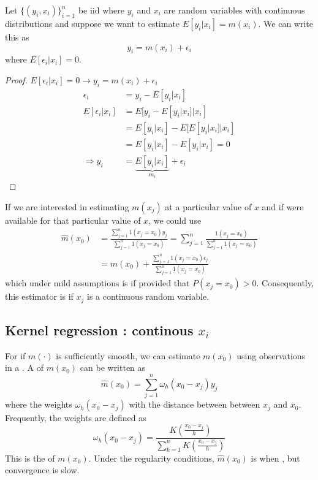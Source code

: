 Let $\{(y_i,x_i)\}_{i=1}^{n}$ be iid where $y_i$ and $x_i$ are random variables with continuous distributions and suppose we want to estimate $E[y_i|x_i] = m(x_i)$.
We can write this as 
\begin{equation*}
    y_i = m(x_i) + \epsilon_i
\end{equation*}
where $E[\epsilon_i|x_i] = 0$.
\begin{proof}
    $E[\epsilon_i|x_i] = 0\to y_i = m(x_i) + \epsilon_i$
    \begin{align*}
        \epsilon_i & = y_i - E[y_i|x_i]\\
        E[\epsilon_i|x_i] & = E[y_i - E[y_i|x_i]|x_i]\\
        & = E[y_i|x_i] - E[E[y_i|x_i]|x_i]\\
        & = E[y_i|x_i] - E[y_i|x_i] = 0\\
        \Rightarrow y_i & = \underbrace{E[y_i|x_i]}_{m_i} + \epsilon_i 
    \end{align*}
\end{proof}

If we are interested in estimating $m(x_j)$ at a particular value of $x$ and if  were available for that particular value of $x$,
we could use
\begin{align*}
    \hat{m}(x_0) & = \frac{\sum_{j=1}^{n}1(x_j=x_0)y_j}{\sum_{j=1}^{n}1(x_j=x_0)} = \sum_{j=1}^{n}\frac{1(x_j=x_0)}{\sum_{j=1}^{n}1(x_j=x_0)}\\
    & = m(x_0) + \frac{\sum_{j=1}^{n}1(x_j=x_0)\epsilon_j}{\sum_{j=1}^{n}1(x_j=x_0)}
\end{align*}
which under mild assumptions is  if  provided that $P(x_j=x_0)>0$. 
Consequently, this estimator is  if $x_j$ is a continuous random variable.
\\

\subsection{Kernel regression : continous $x_i$}

For  if $m(\cdot)$ is sufficiently smooth, we can estimate $m(x_0)$ using observations in a .
A  of $m(x_0)$ can be written as 
\begin{equation*}
    \hat{m}(x_0) = \sum_{j=1}^{n}\omega_h(x_0-x_j)y_j
\end{equation*}
where the weights $\omega_h(x_0-x_j)$  with the distance between between $x_j$ and $x_0$.
Frequently, the weights are defined as 
\begin{equation*}
    \omega_h(x_0-x_j) = \frac{K(\frac{x_0-x_j}{h})}{\sum_{k=1}^{n}K(\frac{x_0-x_j}{h})}
\end{equation*}
This is the  of $m(x_0)$.
Under the regularity conditions, $\hat{m}(x_0)$ is  when , but convergence is slow.\\

